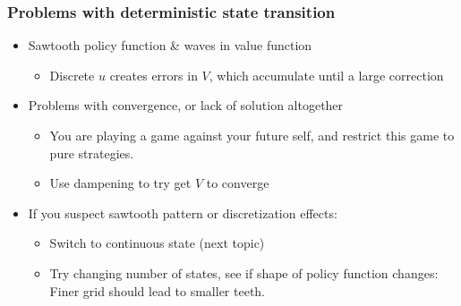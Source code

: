 \documentclass[bigger,handout]{beamer}
\begin{document}
\begin{frame}%

\frametitle{Problems with deterministic state transition}

\begin{itemize}
\item Sawtooth policy function \& waves in value function

\begin{itemize}
\item Discrete $u$ creates errors in $V$, which accumulate \newline
until a large correction
\end{itemize}

\item Problems with convergence, or lack of solution altogether

\begin{itemize}
\item You are playing a game against your future self, \newline
and restrict this game to pure strategies.

\item Use dampening to try get $V$ to converge\bigskip
\end{itemize}

\item If you suspect sawtooth pattern or discretization effects:

\begin{itemize}
\item Switch to continuous state (next topic)

\item Try changing number of states, see if shape of policy function
changes: Finer grid should lead to smaller teeth.
\end{itemize}
\end{itemize}



\end{frame}%
\end{document}
